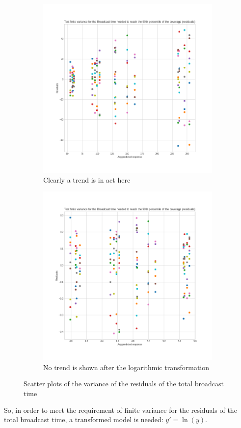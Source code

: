 \begin{figure}[!ht]
	\centering
	\begin{subfigure}[b]{0.49\textwidth}
		\centering
		\includegraphics[width=\textwidth]{img/hd/broadcasttime-variance}
		\caption{Clearly a trend is in act
		here}\label{subfig:hdtimevariancebad}
	\end{subfigure}
	\begin{subfigure}[b]{0.49\textwidth}
		\centering
		\includegraphics[width=\textwidth]{img/hd/broadcasttime-variance-transform}
		\caption{No trend is shown after the logarithmic
		transformation}\label{subfig:hdtimevariancegood}
	\end{subfigure}
	\caption{Scatter plots of the variance of the residuals of the total
	broadcast time}\label{fig:hdtimevariance}
\end{figure}

So, in order to meet the requirement of finite variance for the residuals of the
total broadcast time, a transformed model is needed: \(y' = \ln(y)\).

